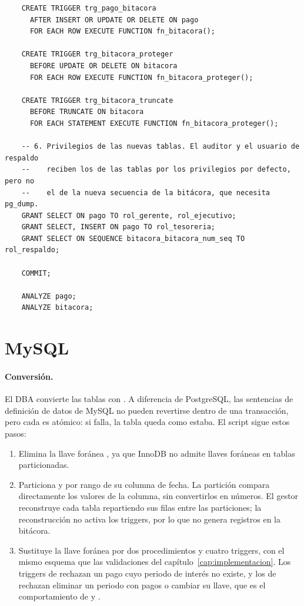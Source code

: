 \begin{verbatim}
	CREATE TRIGGER trg_pago_bitacora
	  AFTER INSERT OR UPDATE OR DELETE ON pago
	  FOR EACH ROW EXECUTE FUNCTION fn_bitacora();
	
	CREATE TRIGGER trg_bitacora_proteger
	  BEFORE UPDATE OR DELETE ON bitacora
	  FOR EACH ROW EXECUTE FUNCTION fn_bitacora_proteger();
	
	CREATE TRIGGER trg_bitacora_truncate
	  BEFORE TRUNCATE ON bitacora
	  FOR EACH STATEMENT EXECUTE FUNCTION fn_bitacora_proteger();
	
	-- 6. Privilegios de las nuevas tablas. El auditor y el usuario de respaldo
	--    reciben los de las tablas por los privilegios por defecto, pero no
	--    el de la nueva secuencia de la bitácora, que necesita pg_dump.
	GRANT SELECT ON pago TO rol_gerente, rol_ejecutivo;
	GRANT SELECT, INSERT ON pago TO rol_tesoreria;
	GRANT SELECT ON SEQUENCE bitacora_bitacora_num_seq TO rol_respaldo;
	
	COMMIT;
	
	ANALYZE pago;
	ANALYZE bitacora;
\end{verbatim}

\section{MySQL}

\paragraph{Conversión.} El DBA convierte las tablas con . A diferencia de PostgreSQL, las sentencias de definición de datos de MySQL no pueden revertirse dentro de una transacción, pero cada  es atómico: si falla, la tabla queda como estaba. El script sigue estos pasos:

\begin{enumerate}[leftmargin=*]
	\item Elimina la llave foránea , ya que InnoDB no admite llaves foráneas en tablas particionadas.
	\item Particiona  y  por rango de su columna de fecha. La partición  compara directamente los valores de la columna, sin convertirlos en números. El gestor reconstruye cada tabla repartiendo sus filas entre las particiones; la reconstrucción no activa los triggers, por lo que no genera registros en la bitácora.
	\item Sustituye la llave foránea por dos procedimientos y cuatro triggers, con el mismo esquema que las validaciones del capítulo~\ref{cap:implementacion}. Los triggers de  rechazan un pago cuyo periodo de interés no existe, y los de  rechazan eliminar un periodo con pagos o cambiar su llave, que es el comportamiento de  y .
\end{enumerate}

